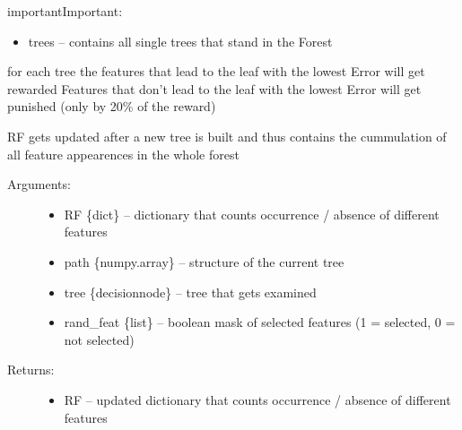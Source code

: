\documentclass[letterpaper,10pt,english]{sphinxmanual}
\begin{document}
\begin{sphinxadmonition}{important}{Important:}
\begin{fulllineitems}
\begin{description}
\begin{itemize}
\item {} 
trees -- contains all single trees that stand in the Forest

\end{itemize}

\end{description}

\end{fulllineitems}

\label{\detokenize{RF:update-rf}}

\begin{fulllineitems}
\label{\detokenize{RF:ForestFire.Main.update_RF}}
for each tree the features that lead to the leaf with the lowest Error will get rewarded
Features that don't lead to the leaf with the lowest Error will get punished (only by 20\% of the reward)

RF gets updated after a new tree is built and thus contains the cummulation of all
feature appearences in the whole forest
\begin{description}
\item[{Arguments:}] \leavevmode\begin{itemize}
\item {} 
RF \{dict\} -- dictionary that counts occurrence / absence of different features

\item {} 
path \{numpy.array\} -- structure of the current tree

\item {} 
tree \{decisionnode\} -- tree that gets examined

\item {} 
rand\_feat \{list\} -- boolean mask of selected features (1 = selected, 0 = not selected)

\end{itemize}

\item[{Returns:}] \leavevmode\begin{itemize}
\item {} 
RF -- updated dictionary that counts occurrence / absence of different features

\end{itemize}

\end{description}


\end{fulllineitems}
\end{sphinxadmonition}
\end{document}
